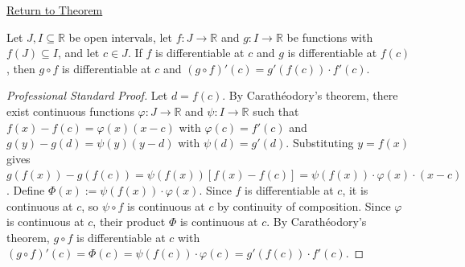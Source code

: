 \newpage
{}
\label{prf:chain-rule}

\begin{remark*}[Return]
\hyperref[thm:chain-rule]{Return to Theorem}
\end{remark*}

\begin{theorem*}
Let $J, I \subseteq \mathbb{R}$ be open intervals, let $f : J \to \mathbb{R}$ and $g : I \to \mathbb{R}$ be functions with $f(J) \subseteq I$, and let $c \in J$. If $f$ is differentiable at $c$ and $g$ is differentiable at $f(c)$, then $g \circ f$ is differentiable at $c$ and $(g \circ f)'(c) = g'(f(c)) \cdot f'(c)$.
\end{theorem*}

\begin{proof}[Professional Standard Proof]
\LRAProofBodyStart
Let $d = f(c)$. By Carathéodory's theorem, there exist continuous functions $\varphi : J \to \mathbb{R}$ and $\psi : I \to \mathbb{R}$ such that $f(x) - f(c) = \varphi(x)(x - c)$ with $\varphi(c) = f'(c)$ and $g(y) - g(d) = \psi(y)(y - d)$ with $\psi(d) = g'(d)$. Substituting $y = f(x)$ gives $g(f(x)) - g(f(c)) = \psi(f(x))[f(x) - f(c)] = \psi(f(x)) \cdot \varphi(x) \cdot (x - c)$. Define $\Phi(x) := \psi(f(x)) \cdot \varphi(x)$. Since $f$ is differentiable at $c$, it is continuous at $c$, so $\psi \circ f$ is continuous at $c$ by continuity of composition. Since $\varphi$ is continuous at $c$, their product $\Phi$ is continuous at $c$. By Carathéodory's theorem, $g \circ f$ is differentiable at $c$ with $(g \circ f)'(c) = \Phi(c) = \psi(f(c)) \cdot \varphi(c) = g'(f(c)) \cdot f'(c)$.
\end{proof}

